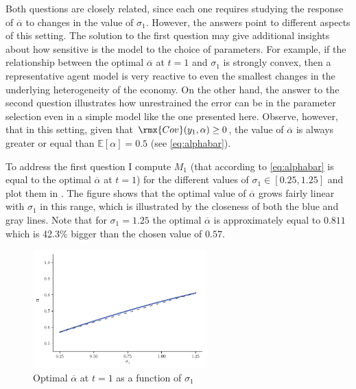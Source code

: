 \documentclass[english, a4paper, 12pt]{article}
\begin{document}
Both questions are closely related, since each one requires studying the response of $\overline{\alpha}$ to changes in the value of $\sigma_{1}$. However, the answers point to different aspects of this setting. The solution to the first question may give additional insights about how sensitive is the model to the choice of parameters. For example, if the relationship between the optimal $\overline{\alpha}$ at $t = 1$ and $\sigma_{1}$ is strongly convex, then a representative agent model is very reactive to even the smallest changes in the underlying heterogeneity of the economy. On the other hand, the answer to the second question illustrates how unrestrained the error can be in the parameter selection even in a simple model like the one presented here. Observe, however, that in this setting, given that $\rmx{Cov}(y_{1},\alpha) \geq 0$, the value of $\overline{\alpha}$ is always greater or equal than $\mathbb{E}[\alpha] = 0.5$ (see \eqref{eq:alphabar}).

To address the first question I compute $M_{1}$ (that according to \eqref{eq:alphabar} is equal to the optimal $\overline{\alpha}$ at $t = 1$) for the different values of $\sigma_{1} \in [0.25, 1.25]$ and plot them in . The figure shows that the optimal value of $\overline{\alpha}$ grows fairly linear with $\sigma_{1}$ in this range, which is illustrated by the closeness of both the blue and gray lines. Note that for $\sigma_{1} = 1.25$ the optimal $\overline{\alpha}$ is approximately equal to $0.811$ which is 42.3\% bigger than the chosen value of $0.57$.
	\begin{figure}[H]
		\caption{Optimal $\overline{\alpha}$ at $t = 1$ as a function of $\sigma_{1}$}
		\label{fig:RAalphaDiff}
		\includegraphics[width = 0.6\textwidth]{RAdiffAlphasPlot}
		\vspace{-1ex}
	\end{figure}
\end{document}
